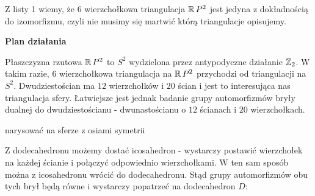 Z listy 1 wiemy, że $6$ wierzchołkowa triangulacja $\operatorname{\mathbb{R}} P^2$ jest jedyna z dokładnością do izomorfizmu, czyli nie musimy się martwić którą triangulacje opisujemy.

\textbf{Plan działania}

Płaszczyzna rzutowa $\operatorname{\mathbb{R}} P^2$ to $S^2$ wydzielona przez antypodyczne działanie $\operatorname{\mathbb{Z}}_2$. W takim razie, $6$ wierzchołkowa triangulacja na $\operatorname{\mathbb{R}} P^2$ przychodzi od triangulacji na $S^2$. Dwudziestościan ma $12$ wierzchołków i $20$ ścian i jest to interesująca nas triangulacja sfery. Łatwiejsze jest jednak badanie grupy automorfizmów bryły dualnej do dwudziestościanu - dwunastościanu o $12$ ścianach i $20$ wierzchołkach.

{\large\color{red}narysować na sferze z osiami symetrii}

Z dodecahedronu możemy dostać icosahedron - wystarczy postawić wierzchołek na każdej ścianie i połączyć odpowiednio wierzchołkami. W ten sam sposób można z icosahedronu wrócić do dodecahedronu. Stąd grupy automorfizmów obu tych brył będą równe i wystarczy popatrzeć na dodecahedron $D$:

